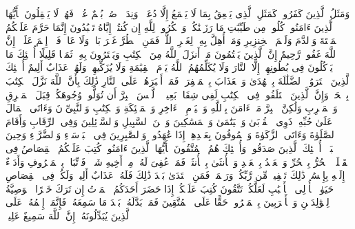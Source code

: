 \stopbuffer
\startbuffer[\q:2:171]
وَمَثَلُ ٱلَّذِینَ كَفَرُوا۟ كَمَثَلِ ٱلَّذِی یَنۡعِقُ بِمَا لَا یَسۡمَعُ إِلَّا دُعَاۤءࣰ وَنِدَاۤءࣰۚ صُمُّۢ بُكۡمٌ عُمۡیࣱ فَهُمۡ لَا یَعۡقِلُونَ%
\stopbuffer
\startbuffer[\q:2:172]
یَٰۤأَیُّهَا ٱلَّذِینَ ءَامَنُوا۟ كُلُوا۟ مِن طَیِّبَٰتِ مَا رَزَقۡنَٰكُمۡ وَٱشۡكُرُوا۟ لِلَّهِ إِن كُنتُمۡ إِیَّاهُ تَعۡبُدُونَ%
\stopbuffer
\startbuffer[\q:2:173]
إِنَّمَا حَرَّمَ عَلَیۡكُمُ ٱلۡمَیۡتَةَ وَٱلدَّمَ وَلَحۡمَ ٱلۡخِنزِیرِ وَمَاۤ أُهِلَّ بِهِۦ لِغَیۡرِ ٱللَّهِۖ فَمَنِ ٱضۡطُرَّ غَیۡرَ بَاغࣲ وَلَا عَادࣲ فَلَاۤ إِثۡمَ عَلَیۡهِۚ إِنَّ ٱللَّهَ غَفُورࣱ رَّحِیمٌ%
\stopbuffer
\startbuffer[\q:2:174]
إِنَّ ٱلَّذِینَ یَكۡتُمُونَ مَاۤ أَنزَلَ ٱللَّهُ مِنَ ٱلۡكِتَٰبِ وَیَشۡتَرُونَ بِهِۦ ثَمَنࣰا قَلِیلًا أُو۟لَٰۤئِكَ مَا یَأۡكُلُونَ فِی بُطُونِهِمۡ إِلَّا ٱلنَّارَ وَلَا یُكَلِّمُهُمُ ٱللَّهُ یَوۡمَ ٱلۡقِیَٰمَةِ وَلَا یُزَكِّیهِمۡ وَلَهُمۡ عَذَابٌ أَلِیمٌ%
\stopbuffer
\startbuffer[\q:2:175]
أُو۟لَٰۤئِكَ ٱلَّذِینَ ٱشۡتَرَوُا۟ ٱلضَّلَٰلَةَ بِٱلۡهُدَىٰ وَٱلۡعَذَابَ بِٱلۡمَغۡفِرَةِۚ فَمَاۤ أَصۡبَرَهُمۡ عَلَى ٱلنَّارِ%
\stopbuffer
\startbuffer[\q:2:176]
ذَٰلِكَ بِأَنَّ ٱللَّهَ نَزَّلَ ٱلۡكِتَٰبَ بِٱلۡحَقِّۗ وَإِنَّ ٱلَّذِینَ ٱخۡتَلَفُوا۟ فِی ٱلۡكِتَٰبِ لَفِی شِقَاقِۭ بَعِیدࣲ%
\stopbuffer
\startbuffer[\q:2:177]
۞ لَّیۡسَ ٱلۡبِرَّ أَن تُوَلُّوا۟ وُجُوهَكُمۡ قِبَلَ ٱلۡمَشۡرِقِ وَٱلۡمَغۡرِبِ وَلَٰكِنَّ ٱلۡبِرَّ مَنۡ ءَامَنَ بِٱللَّهِ وَٱلۡیَوۡمِ ٱلۡءَاخِرِ وَٱلۡمَلَٰۤئِكَةِ وَٱلۡكِتَٰبِ وَٱلنَّبِیِّۦنَ وَءَاتَى ٱلۡمَالَ عَلَىٰ حُبِّهِۦ ذَوِی ٱلۡقُرۡبَىٰ وَٱلۡیَتَٰمَىٰ وَٱلۡمَسَٰكِینَ وَٱبۡنَ ٱلسَّبِیلِ وَٱلسَّاۤئِلِینَ وَفِی ٱلرِّقَابِ وَأَقَامَ ٱلصَّلَوٰةَ وَءَاتَى ٱلزَّكَوٰةَ وَٱلۡمُوفُونَ بِعَهۡدِهِمۡ إِذَا عَٰهَدُوا۟ۖ وَٱلصَّٰبِرِینَ فِی ٱلۡبَأۡسَاۤءِ وَٱلضَّرَّاۤءِ وَحِینَ ٱلۡبَأۡسِۗ أُو۟لَٰۤئِكَ ٱلَّذِینَ صَدَقُوا۟ۖ وَأُو۟لَٰۤئِكَ هُمُ ٱلۡمُتَّقُونَ%
\stopbuffer
\startbuffer[\q:2:178]
یَٰۤأَیُّهَا ٱلَّذِینَ ءَامَنُوا۟ كُتِبَ عَلَیۡكُمُ ٱلۡقِصَاصُ فِی ٱلۡقَتۡلَىۖ ٱلۡحُرُّ بِٱلۡحُرِّ وَٱلۡعَبۡدُ بِٱلۡعَبۡدِ وَٱلۡأُنثَىٰ بِٱلۡأُنثَىٰۚ فَمَنۡ عُفِیَ لَهُۥ مِنۡ أَخِیهِ شَیۡءࣱ فَٱتِّبَاعُۢ بِٱلۡمَعۡرُوفِ وَأَدَاۤءٌ إِلَیۡهِ بِإِحۡسَٰنࣲۗ ذَٰلِكَ تَخۡفِیفࣱ مِّن رَّبِّكُمۡ وَرَحۡمَةࣱۗ فَمَنِ ٱعۡتَدَىٰ بَعۡدَ ذَٰلِكَ فَلَهُۥ عَذَابٌ أَلِیمࣱ%
\stopbuffer
\startbuffer[\q:2:179]
وَلَكُمۡ فِی ٱلۡقِصَاصِ حَیَوٰةࣱ یَٰۤأُو۟لِی ٱلۡأَلۡبَٰبِ لَعَلَّكُمۡ تَتَّقُونَ%
\stopbuffer
\startbuffer[\q:2:180]
كُتِبَ عَلَیۡكُمۡ إِذَا حَضَرَ أَحَدَكُمُ ٱلۡمَوۡتُ إِن تَرَكَ خَیۡرًا ٱلۡوَصِیَّةُ لِلۡوَٰلِدَیۡنِ وَٱلۡأَقۡرَبِینَ بِٱلۡمَعۡرُوفِۖ حَقًّا عَلَى ٱلۡمُتَّقِینَ%
\stopbuffer
\startbuffer[\q:2:181]
فَمَنۢ بَدَّلَهُۥ بَعۡدَ مَا سَمِعَهُۥ فَإِنَّمَاۤ إِثۡمُهُۥ عَلَى ٱلَّذِینَ یُبَدِّلُونَهُۥۤۚ إِنَّ ٱللَّهَ سَمِیعٌ عَلِیمࣱ%
